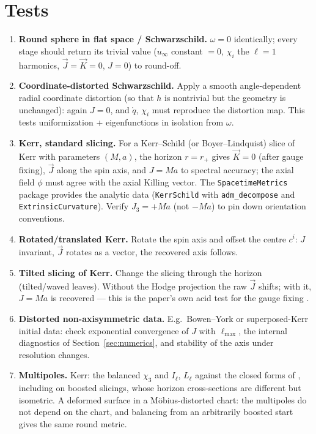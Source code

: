 \documentclass[11pt]{article}
\newcommand{\qo}{\mathring{q}}          %
\newcommand{\vJ}{\vec{J}}
\newcommand{\vK}{\vec{K}}
\begin{document}
\section{Tests}
\label{sec:tests}

\begin{enumerate}
\item \textbf{Round sphere in flat space / Schwarzschild.}  $\omega = 0$
  identically; every stage should return its trivial value ($u_\infty$
  constant $=0$, $\chi_i$ the $\ell=1$ harmonics, $\vJ=\vK=0$, $J = 0$) to
  round-off.
\item \textbf{Coordinate-distorted Schwarzschild.}  Apply a smooth
  angle-dependent radial coordinate distortion (so that $h$ is nontrivial
  but the geometry is unchanged): again $J=0$, and $\qo$, $\chi_i$ must
  reproduce the distortion map.  This tests uniformization + eigenfunctions
  in isolation from $\omega$.
\item \textbf{Kerr, standard slicing.}  For a Kerr--Schild (or
  Boyer--Lindquist) slice of Kerr with parameters $(M,a)$, the horizon
  $r=r_+$ gives $\vK=0$ (after gauge fixing), $\vJ$ along the spin axis,
  and $J = Ma$ to spectral accuracy; the axial field $\phi$ must agree with
  the axial Killing vector.  The \texttt{SpacetimeMetrics} package provides
  the analytic data (\texttt{KerrSchild} with \texttt{adm\_decompose} and
  \texttt{ExtrinsicCurvature}).  Verify $J_3=+Ma$ (not $-Ma$)
  to pin down orientation conventions.
\item \textbf{Rotated/translated Kerr.}  Rotate the spin axis and offset the
  centre $c^i$: $J$ invariant, $\vJ$ rotates as a vector, the recovered axis
  follows.
\item \textbf{Tilted slicing of Kerr.}  Change the slicing through the
  horizon (tilted/waved leaves).  Without the Hodge projection the raw
  $\vJ$ shifts; with it, $J=Ma$ is recovered --- this is the paper's own
  acid test for the gauge fixing \cite{korzynski2007}.
\item \textbf{Distorted non-axisymmetric data.}  E.g.\ Bowen--York or
  superposed-Kerr initial data: check exponential convergence of $J$ with
  $\ell_{\max}$, the internal diagnostics of
  Section~\ref{sec:numerics}, and stability of the axis under resolution
  changes.
\item \textbf{Multipoles.}  Kerr: the balanced $\chi_3$ and $I_\ell$,
  $L_\ell$ against the closed forms of \cite{glc2026}, including on boosted
  slicings, whose horizon cross-sections are different but isometric.  A
  deformed surface in a M\"obius-distorted chart: the multipoles do not depend
  on the chart, and balancing from an arbitrarily boosted start gives the same
  round metric.
\end{enumerate}
\end{document}
